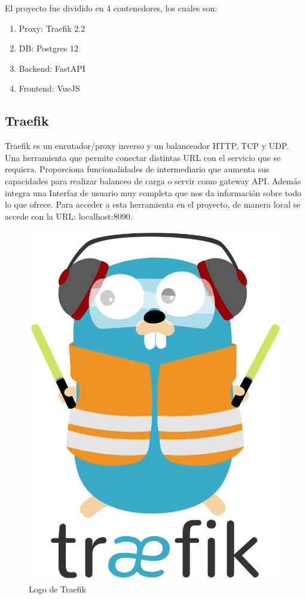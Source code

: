 El proyecto fue dividido en 4 contenedores, los cuales son:
\begin{enumerate}
    \item Proxy: Traefik 2.2
    \item DB: Postgres 12
    \item Backend: FastAPI
    \item Frontend: VueJS
\end{enumerate}

\subsection{Traefik}
Traefik es un enrutador/proxy inverso y un balanceador HTTP, TCP y UDP. Una herramienta que permite conectar distintas URL con el servicio que se requiera. Proporciona funcionalidades de intermediario que aumenta sus capacidades para realizar balanceo de carga o servir como gateway API. Además integra una Interfaz de usuario muy completa que nos da información sobre todo lo que ofrece. Para acceder a esta herramienta en el proyecto, de manera local se accede con la URL: localhost:8090.

\begin{figure}[!htb]
    \centering
    \includegraphics[scale=0.1]{TT/img/implementacion/Traefik.logo.png}
    \caption{Logo de Traefik}
    \label{graphic:TraefikLogo}    
\end{figure}

